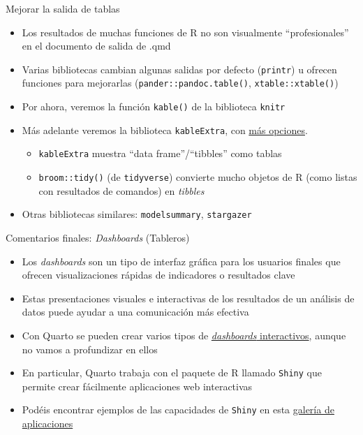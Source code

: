 \documentclass[
  10pt,
  ignorenonframetext,
]{beamer}
\providecommand{\tightlist}{%
  \setlength{\itemsep}{0pt}\setlength{\parskip}{0pt}}\usepackage{longtable,booktabs,array}
\begin{document}
\begin{frame}[fragile]{Mejorar la salida de tablas}
\label{mejorar-la-salida-de-tablas}
\begin{itemize}
\item
  Los resultados de muchas funciones de R no son visualmente
  ``profesionales'' en el documento de salida de .qmd
\item
  Varias bibliotecas cambian algunas salidas por defecto
  (\texttt{printr}) u ofrecen funciones para mejorarlas
  (\texttt{pander::pandoc.table()}, \texttt{xtable::xtable()})
\end{itemize}

\begin{itemize}
\item
  Por ahora, veremos la función \texttt{kable()} de la biblioteca
  \texttt{knitr}
\item
  Más adelante veremos la biblioteca \texttt{kableExtra}, con
  \href{https://cran.r-project.org/web/packages/kableExtra/vignettes/awesome_table_in_html.html}{más
  opciones}.

  \begin{itemize}
  \item
    \texttt{kableExtra} muestra ``data frame''/``tibbles'' como tablas
  \item
    \texttt{broom::tidy()} (de \texttt{tidyverse}) convierte mucho
    objetos de R (como listas con resultados de comandos) en
    \emph{tibbles}
  \end{itemize}
\end{itemize}

\begin{itemize}
\tightlist
\item
  Otras bibliotecas similares: \texttt{modelsummary}, \texttt{stargazer}
\end{itemize}
\end{frame}

\begin{frame}[fragile]{Comentarios finales: \emph{Dashboards}
(Tableros)}
\label{comentarios-finales-dashboards-tableros}
\begin{itemize}
\item
  Los \emph{dashboards} son un tipo de interfaz gráfica para los
  usuarios finales que ofrecen visualizaciones rápidas de indicadores o
  resultados clave
\item
  Estas presentaciones visuales e interactivas de los resultados de un
  análisis de datos puede ayudar a una comunicación más efectiva
\item
  Con Quarto se pueden crear varios tipos de
  \href{https://quarto.org/docs/interactive/}{\emph{dashboards}
  interactivos}, aunque no vamos a profundizar en ellos
\item
  En particular, Quarto trabaja con el paquete de R llamado
  \texttt{Shiny} que permite crear fácilmente aplicaciones web
  interactivas
\item
  Podéis encontrar ejemplos de las capacidades de \texttt{Shiny} en esta
  \href{https://shiny.rstudio.com/gallery/}{galería de aplicaciones}
\end{itemize}
\end{frame}
\end{document}
